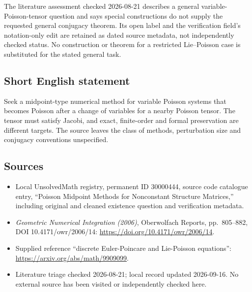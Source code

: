 \documentclass[11pt]{article}
\begin{document}
The literature assessment checked 2026-08-21 describes a general variable-Poisson-tensor question and says special constructions do not supply the requested general conjugacy theorem. Its open label and the verification field's notation-only edit are retained as dated source metadata, not independently checked status. No construction or theorem for a restricted Lie--Poisson case is substituted for the stated general task.
\subsection{Short English statement}
Seek a midpoint-type numerical method for variable Poisson systems that becomes Poisson after a change of variables for a nearby Poisson tensor. The tensor must satisfy Jacobi, and exact, finite-order and formal preservation are different targets. The source leaves the class of methods, perturbation size and conjugacy conventions unspecified.
\subsection{Sources}
\begin{itemize}
\item Local UnsolvedMath registry, permanent ID 30000444, source code catalogue entry, ``Poisson Midpoint Methods for Nonconstant Structure Matrices,'' including original and cleaned existence question and verification metadata.
\item \emph{Geometric Numerical Integration (2006)}, Oberwolfach Reports, pp.\ 805--882, DOI 10.4171/owr/2006/14: \url{https://doi.org/10.4171/owr/2006/14}.
\item Supplied reference ``discrete Euler-Poincare and Lie-Poisson equations'': \url{https://arxiv.org/abs/math/9909099}.
\item Literature triage checked 2026-08-21; local record updated 2026-09-16. No external source has been visited or independently checked here.
\end{itemize}
\end{document}
